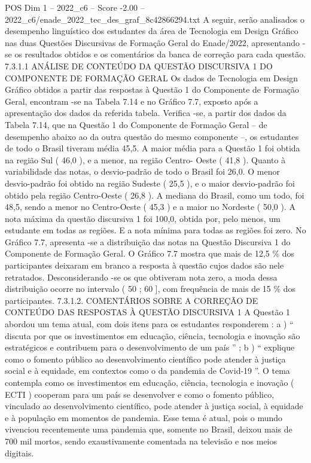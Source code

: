 \begin{textsample}{POS Dim 1 – 2022\_c6 – Score -2.00 – 2022\_c6/enade\_2022\_tec\_des\_graf\_8c42866294.txt}
A seguir, serão analisados o desempenho linguístico dos estudantes da área de Tecnologia em Design Gráfico nas duas Questões Discursivas de Formação Geral do Enade/2022, apresentando -se os resultados obtidos e os comentários da banca de correção para cada questão. 7.3.1.1 ANÁLISE DE CONTEÚDO DA QUESTÃO DISCURSIVA 1 DO COMPONENTE DE FORMAÇÃO GERAL Os dados de Tecnologia em Design Gráfico obtidos a partir das respostas à Questão 1 do Componente de Formação Geral, encontram -se na Tabela 7.14 e no Gráfico 7.7, exposto após a apresentação dos dados da referida tabela.
Verifica -se, a partir dos dados da Tabela 7.14, que na Questão 1 do Componente de Formação Geral – de desempenho abaixo ao da outra questão do mesmo componente –, os estudantes de todo o Brasil tiveram média 45,5.
A maior média para a Questão 1 foi obtida na região Sul ( 46,0 ), e a menor, na região Centro- Oeste ( 41,8 ).
Quanto à variabilidade das notas, o desvio-padrão de todo o Brasil foi 26,0.
O menor desvio-padrão foi obtido na região Sudeste ( 25,5 ), e o maior desvio-padrão foi obtido pela região Centro-Oeste ( 26,8 ).
A mediana do Brasil, como um todo, foi 48,5, sendo a menor no Centro-Oeste ( 45,3 ) e a maior no Nordeste ( 50,0 ).
A nota máxima da questão discursiva 1 foi 100,0, obtida por, pelo menos, um estudante em todas as regiões.
E a nota mínima para todas as regiões foi zero.
No Gráfico 7.7, apresenta -se a distribuição das notas na Questão Discursiva 1 do Componente de Formação Geral.
O Gráfico 7.7 mostra que mais de 12,5 \% dos participantes deixaram em branco a resposta à questão cujos dados são nele retratados.
Desconsiderando -se os que obtiveram nota zero, a moda dessa distribuição ocorre no intervalo ( 50 ; 60 ], com frequência de mais de 15 \% dos participantes. 7.3.1.2.
COMENTÁRIOS SOBRE A CORREÇÃO DE CONTEÚDO DAS RESPOSTAS À QUESTÃO DISCURSIVA 1 A Questão 1 abordou um tema atual, com dois itens para os estudantes responderem : a ) “ discuta por que os investimentos em educação, ciência, tecnologia e inovação são estratégicos e contribuem para o desenvolvimento de um país ” ; b ) “ explique como o fomento público ao desenvolvimento científico pode atender à justiça social e à equidade, em contextos como o da pandemia de Covid-19 ”.
O tema contempla como os investimentos em educação, ciência, tecnologia e inovação ( ECTI ) cooperam para um país se desenvolver e como o fomento público, vinculado ao desenvolvimento científico, pode atender à justiça social, à equidade e à população em momentos de pandemia.
Esse tema é atual, pois o mundo vivenciou recentemente uma pandemia que, somente no Brasil, deixou mais de 700 mil mortos, sendo exaustivamente comentada na televisão e nos meios digitais.

\end{textsample}
